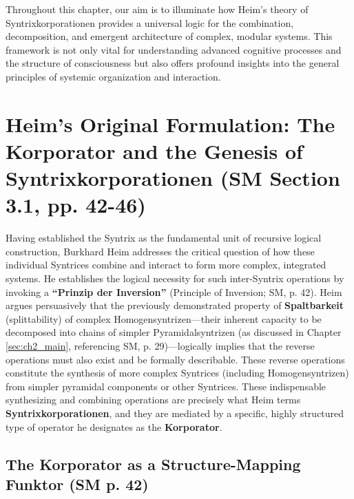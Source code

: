 \documentclass[
    12pt,              %
    a4paper,           %
    headings=normal,   %
    twoside=true,      %
    BCOR=8mm,          %
]{scrbook}
\newcommand{\q}[1]{\enquote{#1}}
\begin{document}
Throughout this chapter, our aim is to illuminate how Heim's theory of Syntrixkorporationen provides a universal logic for the combination, decomposition, and emergent architecture of complex, modular systems. This framework is not only vital for understanding advanced cognitive processes and the structure of consciousness but also offers profound insights into the general principles of systemic organization and interaction.

\section{Heim's Original Formulation: The Korporator and the Genesis of Syntrixkorporationen (SM Section 3.1, pp. 42-46)}
\label{sec:ch3_heim_korporator_original}

Having established the Syntrix as the fundamental unit of recursive logical construction, Burkhard Heim addresses the critical question of how these individual Syntrices combine and interact to form more complex, integrated systems. He establishes the logical necessity for such inter-Syntrix operations by invoking a \textbf{\q{Prinzip der Inversion}} (Principle of Inversion; SM, p. 42). Heim argues persuasively that the previously demonstrated property of \textbf{Spaltbarkeit} (splittability) of complex Homogensyntrizen—their inherent capacity to be decomposed into chains of simpler Pyramidalsyntrizen (as discussed in Chapter \ref{sec:ch2_main}, referencing SM, p. 29)—logically implies that the reverse operations must also exist and be formally describable. These reverse operations constitute the synthesis of more complex Syntrices (including Homogensyntrizen) from simpler pyramidal components or other Syntrices. These indispensable synthesizing and combining operations are precisely what Heim terms \textbf{Syntrixkorporationen}, and they are mediated by a specific, highly structured type of operator he designates as the \textbf{Korporator}.

\subsection{The Korporator as a Structure-Mapping Funktor (SM p. 42)}
\label{sec:ch3_korporator_as_funktor} 
\end{document}
